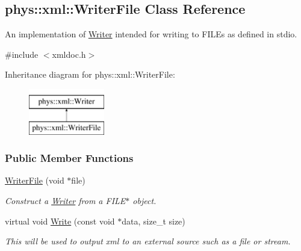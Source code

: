 \hypertarget{classphys_1_1xml_1_1WriterFile}{
\subsection{phys::xml::WriterFile Class Reference}
\label{dc/d53/classphys_1_1xml_1_1WriterFile}
}


An implementation of \hyperlink{classphys_1_1xml_1_1Writer}{Writer} intended for writing to FILEs as defined in stdio.  




{\ttfamily \#include $<$xmldoc.h$>$}

Inheritance diagram for phys::xml::WriterFile:\begin{figure}[H]
\begin{center}
\leavevmode
\includegraphics[height=2.000000cm]{dc/d53/classphys_1_1xml_1_1WriterFile}
\end{center}
\end{figure}
\subsubsection*{Public Member Functions}
\begin{DoxyCompactItemize}
\item 
\hyperlink{classphys_1_1xml_1_1WriterFile_aba665d4dc17c956798a80cb4e8c2774d}{WriterFile} (void $\ast$file)
\begin{DoxyCompactList}\small\item\em Construct a \hyperlink{classphys_1_1xml_1_1Writer}{Writer} from a FILE$\ast$ object. \item\end{DoxyCompactList}\item 
virtual void \hyperlink{classphys_1_1xml_1_1WriterFile_afb46a51336fd6072e8c774da8af31172}{Write} (const void $\ast$data, size\_\-t size)
\begin{DoxyCompactList}\small\item\em This will be used to output xml to an external source such as a file or stream. \item\end{DoxyCompactList}\end{DoxyCompactItemize}


